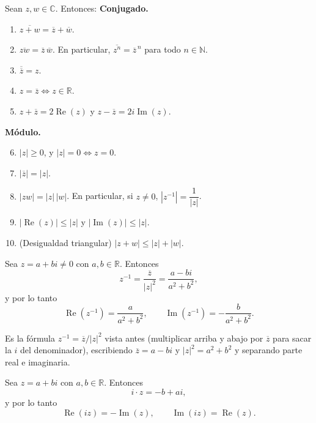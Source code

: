 \begin{proposicion}[{title={Propiedades del conjugado y del módulo}}]
Sean $z,w\in\mathbb{C}$. Entonces:
\textbf{Conjugado.}
\begin{enumerate}
    \item $\overline{z+w}=\overline{z}+\overline{w}$.
    \item $\overline{zw}=\overline{z}\,\overline{w}$. En particular,
$\overline{z^n}=\overline{z}^{\,n}$ para todo $n\in\mathbb{N}$.
    \item $\overline{\overline{z}}=z$.
    \item $z=\overline{z}\iff z\in\mathbb{R}$.
    \item $z+\overline{z}=2\operatorname{Re}(z)$ y
    $z-\overline{z}=2i\operatorname{Im}(z)$.
\end{enumerate}
\textbf{Módulo.}
\begin{enumerate}
    \setcounter{enumi}{5}
    \item $|z|\ge 0$, y $|z|=0\iff z=0$.
    \item $|\overline{z}|=|z|$.
    \item $|zw|=|z|\,|w|$. En particular, si $z\neq 0$, $|z^{-1}|=\dfrac{1}{|z|}$.
    \item $|\operatorname{Re}(z)|\le|z|$ y $|\operatorname{Im}(z)|\le|z|$.
    \item (Desigualdad triangular) $|z+w|\le|z|+|w|$.
\end{enumerate}
\end{proposicion}
\begin{proposicion}[{title={Parte real e imaginaria del inverso}}]
Sea $z=a+bi\neq 0$ con $a,b\in\mathbb{R}$. Entonces
\[
z^{-1}=\frac{\overline{z}}{|z|^2}=\frac{a-bi}{a^2+b^2},
\]
y por lo tanto
\[
\operatorname{Re}(z^{-1})=\frac{a}{a^2+b^2},
\qquad
\operatorname{Im}(z^{-1})=-\frac{b}{a^2+b^2}.
\]
\end{proposicion}
\begin{demostracion}
Es la fórmula $z^{-1}=\overline{z}/|z|^2$ vista antes (multiplicar arriba y abajo
por $\overline{z}$ para sacar la $i$ del denominador), escribiendo
$\overline{z}=a-bi$ y $|z|^2=a^2+b^2$ y separando parte real e imaginaria.
\end{demostracion}
\begin{proposicion}[{title={Multiplicar por $i$}}]
Sea $z=a+bi$ con $a,b\in\mathbb{R}$. Entonces
\[
i\cdot z=-b+ai,
\]
y por lo tanto
\[
\operatorname{Re}(iz)=-\operatorname{Im}(z),
\qquad
\operatorname{Im}(iz)=\operatorname{Re}(z).
\]
\end{proposicion}
